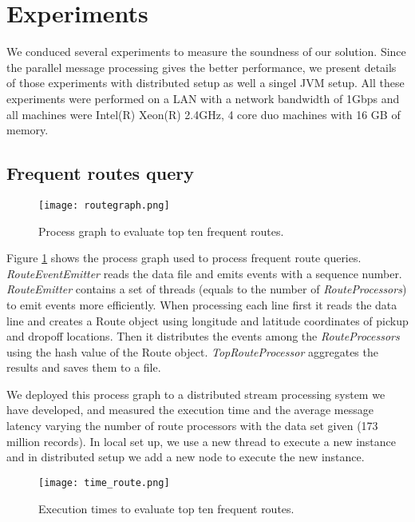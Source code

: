 \section{Experiments}
We conduced several experiments to measure the soundness of our solution. Since the parallel message processing gives the better performance, we present details of those experiments with distributed setup as well a singel JVM setup. All these experiments were performed on a LAN with a network bandwidth of 1Gbps and all machines were Intel(R) Xeon(R) 2.4GHz, 4 core duo machines with 16 GB of memory. 

\subsection{Frequent routes query}

\begin{figure}[!t]
        \centering
        \texttt{[image: routegraph.png]}
        \caption{Process graph to evaluate top ten frequent routes.}
        \label{routegraph}
\end{figure}

Figure \ref{routegraph} shows the process graph used to process frequent route queries. \textit{RouteEventEmitter} reads the data file and emits events with a sequence number. \textit{RouteEmitter} contains a set of threads (equals to the number of \textit{RouteProcessors}) to emit events more efficiently. When processing each line first it reads the data line and creates a Route object using longitude and latitude coordinates of pickup and dropoff locations. Then it distributes the events among the \textit{RouteProcessors} using the hash value of the Route object. \textit{TopRouteProcessor} aggregates the results and saves them to a file.

We deployed this process graph to a distributed stream processing system we have developed, and  measured the execution time and the average message latency varying the number of route processors with the data set given (173 million records). In local set up, we use a new thread to execute a new instance and in distributed setup we add a new node to execute the new instance.

\begin{figure}[!t]
        \centering
        \texttt{[image: time\_route.png]}
        \caption{Execution times to evaluate top ten frequent routes.}
        \label{time_route}
\end{figure}
 
